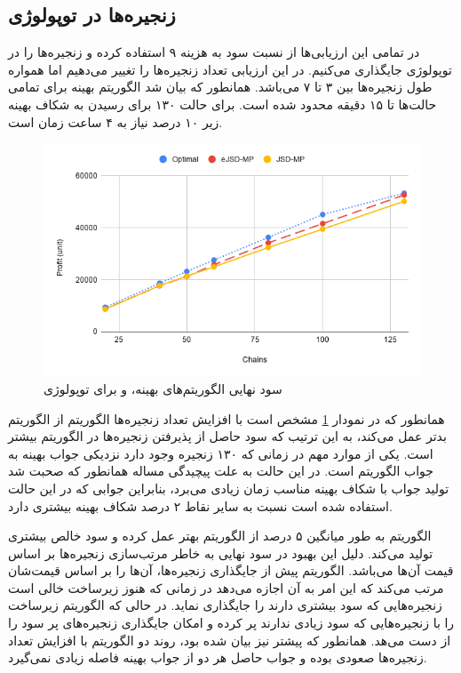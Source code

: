 \subsection{زنجیره‌ها در توپولوژی }

در تمامی این ارزیابی‌ها از نسبت سود به هزینه ۹ استفاده کرده و زنجیره‌ها را در توپولوژی  جایگذاری می‌کنیم.
در این ارزیابی تعداد زنجیره‌ها را تغییر می‌دهیم اما همواره طول زنجیره‌ها بین ۳ تا ۷ می‌باشد.
همانطور که بیان شد الگوریتم بهینه برای تمامی حالت‌ها تا ۱۵ دقیقه محدود شده است. برای حالت ۱۳۰ برای رسیدن به شکاف بهینه زیر ۱۰ درصد نیاز به ۴ ساعت زمان است.


\begin{figure}[h!]
\center\includegraphics[scale=.7]{images/chart-2}
\caption{سود نهایی الگوریتم‌های بهینه،  و  برای توپولوژی }
\label{fig.7}
\end{figure}

همانطور که در نمودار \ref{fig.7} مشخص است با افزایش تعداد زنجیره‌ها الگوریتم  از الگوریتم  بدتر عمل می‌کند،
به این ترتیب که سود حاصل از پذیرفتن زنجیره‌ها در الگوریتم  بیشتر است.
یکی از موارد مهم در زمانی که ۱۳۰ زنجیره وجود دارد نزدیکی جواب بهینه به جواب الگوریتم  است.
در این حالت به علت پیچیدگی مساله همانطور که صحبت شد تولید جواب با شکاف بهینه مناسب زمان زیادی می‌برد،
بنابراین جوابی که در این حالت استفاده شده است نسبت به سایر نقاط ۲ درصد شکاف بهینه بیشتری دارد.

الگوریتم  به طور میانگین ۵ درصد از الگوریتم 
بهتر عمل کرده و سود خالص بیشتری تولید می‌کند.
دلیل این بهبود در سود نهایی به خاطر مرتب‌سازی زنجیره‌ها بر اساس قیمت آن‌ها می‌باشد.
الگوریتم  پیش از جایگذاری زنجیره‌ها، آن‌ها را بر اساس قیمت‌شان مرتب می‌کند
که این امر به آن اجازه می‌دهد در زمانی که هنوز زیرساخت خالی است زنجیره‌هایی که سود بیشتری دارند را جایگذاری نماید.
در حالی که الگوریتم 
زیرساخت را با زنجیره‌هایی که سود زیادی ندارند پر کرده و امکان جایگذاری زنجیره‌های پر سود را از دست می‌هد.
همانطور که پیشتر نیز بیان شده بود، روند دو الگوریتم با افزایش تعداد زنجیره‌ها صعودی بوده و جواب حاصل هر دو از جواب بهینه فاصله
زیادی نمی‌گیرد.


